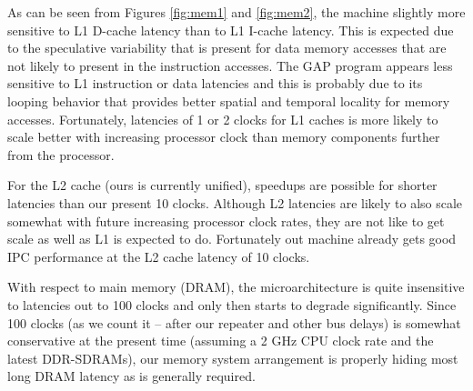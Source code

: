 \documentclass[10pt,dvips]{article}
\begin{document}
%
As can be seen from Figures \ref{fig:mem1} and \ref{fig:mem2},
the machine slightly more sensitive to L1 D-cache latency
than to L1 I-cache latency.  This is expected due to the
speculative variability that is present for data memory accesses
that are not likely to present in the instruction accesses.
The GAP program appears less sensitive to L1 instruction or
data latencies and this is probably due to its looping
behavior that provides better spatial and temporal locality
for memory accesses.  Fortunately, latencies of 1 or 2 clocks
for L1 caches is more likely to scale better with increasing
processor clock than memory components further from the processor.

For the L2 cache (ours is currently unified), speedups are
possible for shorter latencies than our present 10 clocks.
Although L2 latencies are likely to also scale somewhat
with future increasing processor clock rates, they are not like
to get scale as well as L1 is expected to do.
Fortunately out machine already gets good IPC performance
at the L2 cache latency of 10 clocks.

With respect to main memory (DRAM), the microarchitecture
is quite insensitive to latencies out to 100 clocks and
only then starts to degrade significantly.  Since 100 clocks
(as we count it -- after our repeater and other bus delays)
is somewhat conservative at the present time (assuming a 2 GHz
CPU clock rate and the latest DDR-SDRAMs), our memory system
arrangement is properly hiding most long DRAM latency as is
generally required.
%
\end{document}
